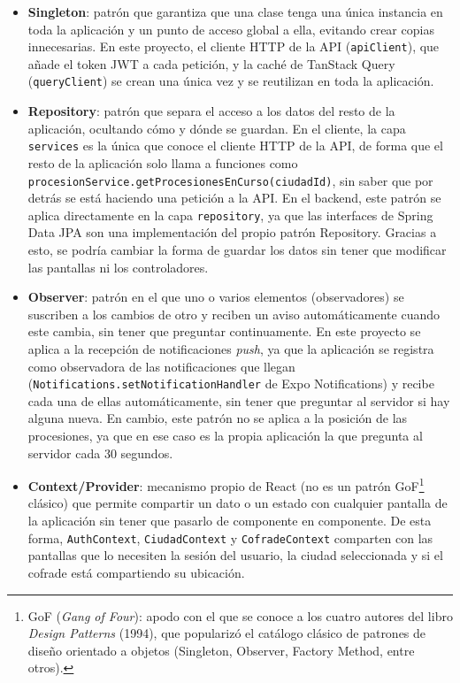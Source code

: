 \begin{itemize}
    \item \textbf{Singleton}: patrón que garantiza que una clase tenga una única instancia en toda la aplicación y un punto de acceso global a ella, evitando crear copias innecesarias. En este proyecto, el cliente HTTP de la API (\texttt{apiClient}), que añade el token JWT a cada petición, y la caché de TanStack Query (\texttt{queryClient}) se crean una única vez y se reutilizan en toda la aplicación.
    \item \textbf{Repository}: patrón que separa el acceso a los datos del resto de la aplicación, ocultando cómo y dónde se guardan. En el cliente, la capa \texttt{services} es la única que conoce el cliente HTTP de la API, de forma que el resto de la aplicación solo llama a funciones como \texttt{procesionService.getProcesionesEnCurso(ciudadId)}, sin saber que por detrás se está haciendo una petición a la API. En el backend, este patrón se aplica directamente en la capa \texttt{repository}, ya que las interfaces de Spring Data JPA son una implementación del propio patrón Repository. Gracias a esto, se podría cambiar la forma de guardar los datos sin tener que modificar las pantallas ni los controladores.
    \item \textbf{Observer}: patrón en el que uno o varios elementos (observadores) se suscriben a los cambios de otro y reciben un aviso automáticamente cuando este cambia, sin tener que preguntar continuamente. En este proyecto se aplica a la recepción de notificaciones \emph{push}, ya que la aplicación se registra como observadora de las notificaciones que llegan (\texttt{Notifications.setNotificationHandler} de Expo Notifications) y recibe cada una de ellas automáticamente, sin tener que preguntar al servidor si hay alguna nueva. En cambio, este patrón no se aplica a la posición de las procesiones, ya que en ese caso es la propia aplicación la que pregunta al servidor cada 30 segundos.
    \item \textbf{Context/Provider}: mecanismo propio de React (no es un patrón GoF\footnote{GoF (\emph{Gang of Four}): apodo con el que se conoce a los cuatro autores del libro \emph{Design Patterns} \cite{gof} (1994), que popularizó el catálogo clásico de patrones de diseño orientado a objetos (Singleton, Observer, Factory Method, entre otros).} clásico) que permite compartir un dato o un estado con cualquier pantalla de la aplicación sin tener que pasarlo de componente en componente. De esta forma, \texttt{AuthContext}, \texttt{CiudadContext} y \texttt{CofradeContext} comparten con las pantallas que lo necesiten la sesión del usuario, la ciudad seleccionada y si el cofrade está compartiendo su ubicación.

\end{itemize}
